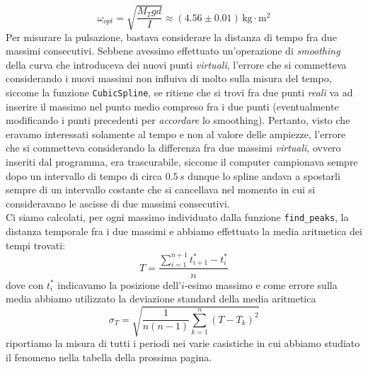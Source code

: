 \documentclass{article}
\begin{document}
\begin{equation}
	\omega_{opt} = \sqrt{ \frac{M_T gd}{I} } \approx (4.56 \pm 0.01) \, \si{\kilogram \cdot \meter^2}
\end{equation}
Per misurare la pulsazione, bastava considerare la distanza di tempo fra due massimi consecutivi. Sebbene avessimo effettuato un'operazione di \emph{smoothing} della curva che introduceva dei nuovi punti \emph{virtuali}, l'errore che si commetteva considerando i nuovi massimi non influiva di molto sulla misura del tempo, siccome la funzione \texttt{CubicSpline}, se ritiene che si trovi fra due punti \emph{reali} va ad inserire il massimo nel punto medio compreso fra i due punti (eventualmente modificando i punti precedenti per \emph{accordare} lo smoothing). Pertanto, visto che eravamo interessati solamente al tempo e non al valore delle ampiezze, l'errore che si commetteva considerando la differenza fra due massimi \emph{virtuali}, ovvero inseriti dal programma, era trascurabile, siccome il computer campionava sempre dopo un intervallo di tempo di circa $0.5 \, s$ dunque lo spline andava a spostarli sempre di un intervallo costante che si cancellava nel momento in cui si consideravano le ascisse di due massimi consecutivi. \\
Ci siamo calcolati, per ogni massimo individuato dalla funzione \texttt{find\_peaks}, la distanza temporale fra i due massimi e abbiamo effettuato la media aritmetica dei tempi trovati:
\begin{equation}
	T = \frac{\sum\limits_{i=1}^{n+1} t^{*}_{i+1} - t^{*}_i}{n}
\end{equation}
dove con $t^{*}_{i}$ indicavamo la posizione dell'$i$-esimo massimo e come errore sulla media abbiamo utilizzato la deviazione standard della media aritmetica
\begin{equation}
	\sigma_{T} = \sqrt{\frac{1}{n(n-1)}\sum_{k=1}^{n} \left( T - T_k \right)^2}
\end{equation}
riportiamo la misura di tutti i periodi nei varie casistiche in cui abbiamo studiato il fenomeno nella tabella della prossima pagina.
\end{document}
